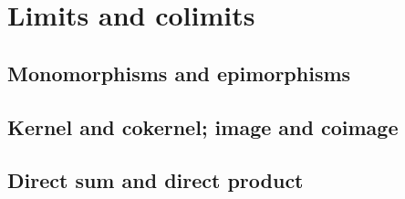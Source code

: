
\section{Limits and colimits}

\subsection{Monomorphisms and epimorphisms}

\subsection{Kernel and cokernel; image and coimage}

\subsection{Direct sum and direct product}
